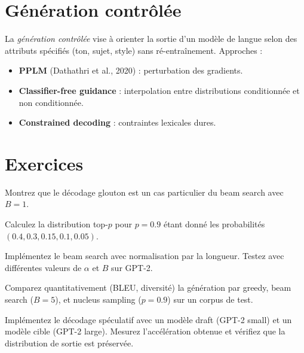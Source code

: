 \section{G\'en\'eration contr\^ol\'ee}
\label{sec:gen:controlee}

\begin{definition}
La \emph{g\'en\'eration contr\^ol\'ee} vise \`a orienter la sortie d'un mod\`ele
de langue selon des attributs sp\'ecifi\'es (ton, sujet, style) sans
r\'e-entra\^inement. Approches :
\begin{itemize}
    \item \textbf{PPLM} (Dathathri et al., 2020) : perturbation des gradients.
    \item \textbf{Classifier-free guidance} : interpolation entre distributions
          conditionn\'ee et non conditionn\'ee.
    \item \textbf{Constrained decoding} : contraintes lexicales dures.
\end{itemize}
\end{definition}

\section{Exercices}
\label{sec:gen:exercices}

\begin{exercice}[$\star$]
Montrez que le d\'ecodage glouton est un cas particulier du beam search avec
$B = 1$.
\end{exercice}

\begin{exercice}[$\star$]
Calculez la distribution top-$p$ pour $p = 0.9$ \'etant donn\'e les
probabilit\'es $(0.4, 0.3, 0.15, 0.1, 0.05)$.
\end{exercice}

\begin{exercice}[$\star\star$]
Impl\'ementez le beam search avec normalisation par la longueur. Testez avec
diff\'erentes valeurs de $\alpha$ et $B$ sur GPT-2.
\end{exercice}

\begin{exercice}[$\star\star$]
Comparez quantitativement (BLEU, diversit\'e) la g\'en\'eration par greedy,
beam search ($B=5$), et nucleus sampling ($p=0.9$) sur un corpus de test.
\end{exercice}

\begin{exercice}[$\star\star\star$]
Impl\'ementez le d\'ecodage sp\'eculatif avec un mod\`ele draft (GPT-2 small)
et un mod\`ele cible (GPT-2 large). Mesurez l'acc\'el\'eration obtenue et
v\'erifiez que la distribution de sortie est pr\'eserv\'ee.
\end{exercice}
